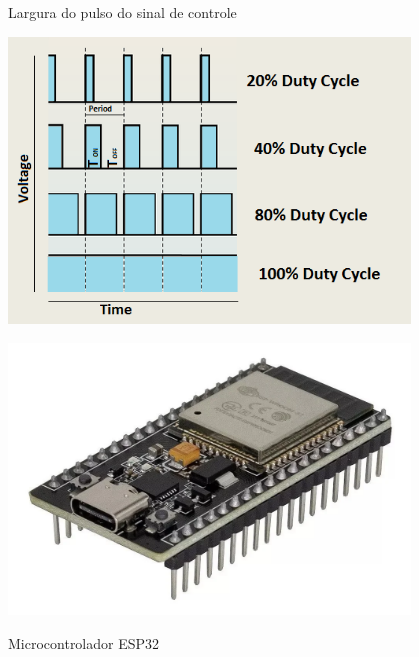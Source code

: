\begin{figure}[H]
    \begin{minipage}{.5\textwidth}
        \centering
        \caption{Largura do pulso do sinal de controle}
        \includegraphics[keepaspectratio=true, width=0.95\textwidth]
            {img/pwm.png}
        \label{fig:pwm}
    \end{minipage}
    \begin{minipage}{.5\textwidth}
        \centering
        \caption{Microcontrolador ESP32}
        \includegraphics[keepaspectratio=true, width=0.95\textwidth]
            {img/foto-esp32.png}
        \label{fig:fotoESP32}
    \end{minipage}%
\end{figure}


